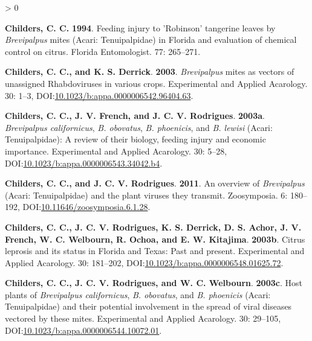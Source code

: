 \documentclass{ufdissertation}[overrideChapters] %
\newlength{\cslhangindent}
\newenvironment{CSLReferences}[2] %
 {%
  \setlength{\parindent}{0pt}
  \ifodd #1 \everypar{\setlength{\hangindent}{\cslhangindent}}\ignorespaces\fi
  \ifnum #2 > 0
  \setlength{\parskip}{#2\baselineskip}
  \fi
 }%
 {}
\begin{document}
{\begin{CSLReferences}{1}{1}
\leavevmode{}%
\textbf{Childers, C. C.} \textbf{1994}. Feeding injury to {'Robinson'} tangerine leaves by {\emph{Brevipalpus}} mites ({Acari}: {Tenuipalpidae}) in {Florida} and evaluation of chemical control on citrus. Florida Entomologist. 77: 265--271.

\leavevmode{}%
\textbf{Childers, C. C., and K. S. Derrick}. \textbf{2003}. {\emph{Brevipalpus}} mites as vectors of unassigned {Rhabdoviruses} in various crops. Experimental and Applied Acarology. 30: 1--3, DOI:\href{https://doi.org/10.1023/b:appa.0000006542.96404.63}{10.1023/b:appa.0000006542.96404.63}.

\leavevmode{}%
\textbf{Childers, C. C., J. V. French, and J. C. V. Rodrigues}. \textbf{2003a}. {\emph{Brevipalpus californicus}}, {\emph{B. obovatus}}, {\emph{B. phoenicis}}, and {\emph{B. lewisi}} ({Acari}: {Tenuipalpidae}): A review of their biology, feeding injury and economic importance. Experimental and Applied Acarology. 30: 5--28, DOI:\href{https://doi.org/10.1023/b:appa.0000006543.34042.b4}{10.1023/b:appa.0000006543.34042.b4}.

\leavevmode{}%
\textbf{Childers, C. C., and J. C. V. Rodrigues}. \textbf{2011}. An overview of {\emph{Brevipalpus}} ({Acari}: {Tenuipalpidae}) and the plant viruses they transmit. Zoosymposia. 6: 180--192, DOI:\href{https://doi.org/10.11646/zoosymposia.6.1.28}{10.11646/zoosymposia.6.1.28}.

\leavevmode{}%
\textbf{Childers, C. C., J. C. V. Rodrigues, K. S. Derrick, D. S. Achor, J. V. French, W. C. Welbourn, R. Ochoa, and E. W. Kitajima}. \textbf{2003b}. {Citrus leprosis} and its status in {Florida} and {Texas}: Past and present. Experimental and Applied Acarology. 30: 181--202, DOI:\href{https://doi.org/10.1023/b:appa.0000006548.01625.72}{10.1023/b:appa.0000006548.01625.72}.

\leavevmode{}%
\textbf{Childers, C. C., J. C. V. Rodrigues, and W. C. Welbourn}. \textbf{2003c}. Host plants of {\emph{Brevipalpus californicus}}, {\emph{B. obovatus}}, and {\emph{B. phoenicis}} ({Acari}: {Tenuipalpidae}) and their potential involvement in the spread of viral diseases vectored by these mites. Experimental and Applied Acarology. 30: 29--105, DOI:\href{https://doi.org/10.1023/b:appa.0000006544.10072.01}{10.1023/b:appa.0000006544.10072.01}.


\end{CSLReferences}}
\end{document}
